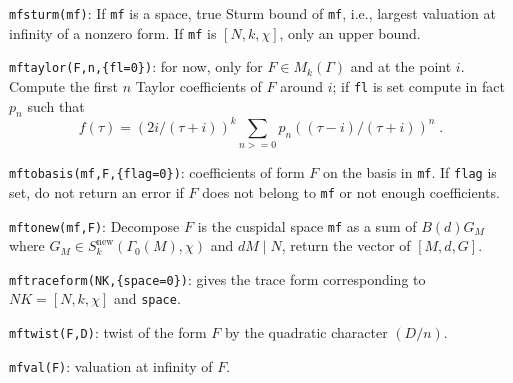 \documentclass[11pt]{article}
\newcommand{\G}{\Gamma}
\newcommand{\new}{\text{new}}
\def\kbd#1{{\tt #1}}
\begin{document}
\kbd{mfsturm(mf)}: If \kbd{mf} is a space, true Sturm bound of \kbd{mf}, i.e.,
largest valuation at infinity of a nonzero form. If \kbd{mf} is $[N,k,\chi]$,
only an upper bound.

\kbd{mftaylor(F,n,\{fl=0\})}: for now, only for $F\in M_k(\G)$ and at the
point $i$. Compute the first $n$ Taylor coefficients of $F$ around $i$;
if \kbd{fl} is set compute in fact $p_n$ such that
$$f(\tau)=(2i/(\tau+i))^k\sum_{n>=0}p_n((\tau-i)/(\tau+i))^n\;.$$

\kbd{mftobasis(mf,F,\{flag=0\})}: coefficients of form $F$ on the basis in
\kbd{mf}. If \kbd{flag} is set, do not return an error if $F$ does not
belong to \kbd{mf} or not enough coefficients.

\kbd{mftonew(mf,F)}: Decompose $F$ is the cuspidal space \kbd{mf} as
a sum of $B(d)G_M$ where $G_M\in S_k^{\new}(\G_0(M),\chi)$ and $dM\mid N$,
return the vector of $[M,d,G]$.

\kbd{mftraceform(NK,\{space=0\})}: gives the trace form corresponding to
$NK=[N,k,\chi]$ and \kbd{space}.

\kbd{mftwist(F,D)}: twist of the form $F$ by the quadratic character
$(D/n)$.

\kbd{mfval(F)}: valuation at infinity of $F$.
\end{document}
